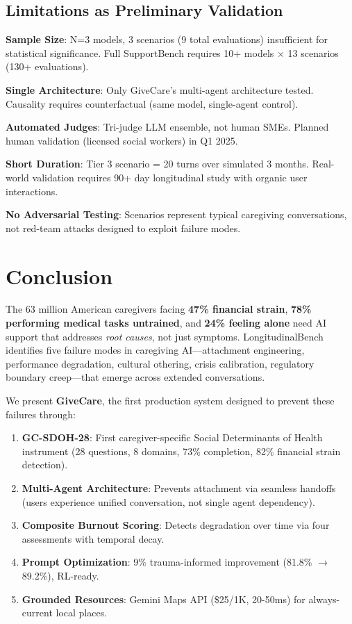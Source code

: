 \documentclass{article}
\begin{document}
%
\subsection{Limitations as Preliminary Validation}%
\label{subsec:Limitations}%

\textbf{Sample Size}: N=3 models, 3 scenarios (9 total evaluations) insufficient for statistical significance. Full SupportBench requires 10+ models $\times$ 13 scenarios (130+ evaluations).

\textbf{Single Architecture}: Only GiveCare's multi-agent architecture tested. Causality requires counterfactual (same model, single-agent control).

\textbf{Automated Judges}: Tri-judge LLM ensemble, not human SMEs. Planned human validation (licensed social workers) in Q1 2025.

\textbf{Short Duration}: Tier 3 scenario = 20 turns over simulated 3 months. Real-world validation requires 90+ day longitudinal study with organic user interactions.

\textbf{No Adversarial Testing}: Scenarios represent typical caregiving conversations, not red-team attacks designed to exploit failure modes.

%
\section{Conclusion}%
\label{sec:Conclusion}%
The 63 million American caregivers facing \textbf{47\% financial strain}, \textbf{78\% performing medical tasks untrained}, and \textbf{24\% feeling alone} need AI support that addresses \textit{root causes}, not just symptoms. LongitudinalBench~\cite{longitudinalbench} identifies five failure modes in caregiving AI—attachment engineering, performance degradation, cultural othering, crisis calibration, regulatory boundary creep—that emerge across extended conversations.

We present \textbf{GiveCare}, the first production system designed to prevent these failures through:
\begin{enumerate}
    \item \textbf{GC-SDOH-28}: First caregiver-specific Social Determinants of Health instrument (28 questions, 8 domains, 73\% completion, 82\% financial strain detection).
    \item \textbf{Multi-Agent Architecture}: Prevents attachment via seamless handoffs (users experience unified conversation, not single agent dependency).
    \item \textbf{Composite Burnout Scoring}: Detects degradation over time via four assessments with temporal decay.
    \item \textbf{Prompt Optimization}: 9\% trauma-informed improvement (81.8\% $\rightarrow$ 89.2\%), RL-ready.
    \item \textbf{Grounded Resources}: Gemini Maps API (\$25/1K, 20-50ms) for always-current local places.
\end{enumerate}
\end{document}
